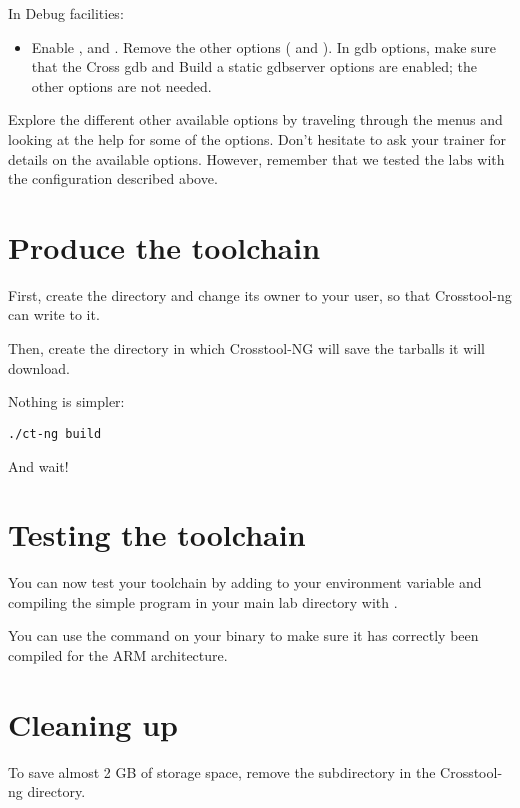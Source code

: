 In Debug facilities:
\begin{itemize}
\item Enable ,  and . Remove the
  other options ( and ). In gdb options, make
  sure that the Cross gdb and Build a static gdbserver options are
  enabled; the other options are not needed.
\end{itemize}

Explore the different other available options by traveling through the
menus and looking at the help for some of the options. Don't hesitate
to ask your trainer for details on the available options. However,
remember that we tested the labs with the configuration described
above.

\section{Produce the toolchain}

First, create the directory  and change its
owner to your user, so that Crosstool-ng can write to it.

Then, create the directory  in which Crosstool-NG
will save the tarballs it will download.

Nothing is simpler:

\begin{verbatim}
./ct-ng build
\end{verbatim}

And wait!

\section{Testing the toolchain}

You can now test your toolchain by adding
 to your
 environment variable and compiling the simple
 program in your main lab directory with
.

You can use the  command on your binary to make sure it has
correctly been compiled for the ARM architecture.

\section{Cleaning up}

To save almost 2 GB of storage space, remove the 
subdirectory in the Crosstool-ng directory.

